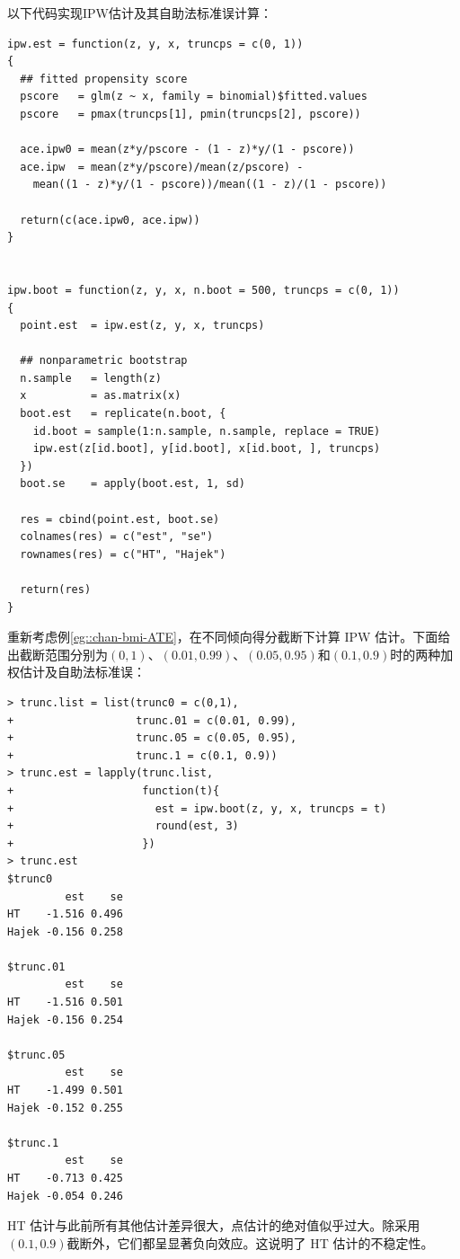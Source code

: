 以下代码实现IPW估计及其自助法标准误计算： 
\begin{lstlisting}
ipw.est = function(z, y, x, truncps = c(0, 1))
{
  ## fitted propensity score
  pscore   = glm(z ~ x, family = binomial)$fitted.values
  pscore   = pmax(truncps[1], pmin(truncps[2], pscore))
  
  ace.ipw0 = mean(z*y/pscore - (1 - z)*y/(1 - pscore))
  ace.ipw  = mean(z*y/pscore)/mean(z/pscore) - 
    mean((1 - z)*y/(1 - pscore))/mean((1 - z)/(1 - pscore))
  
  return(c(ace.ipw0, ace.ipw))     
}


ipw.boot = function(z, y, x, n.boot = 500, truncps = c(0, 1))
{
  point.est  = ipw.est(z, y, x, truncps)
  
  ## nonparametric bootstrap
  n.sample   = length(z)
  x          = as.matrix(x)
  boot.est   = replicate(n.boot, {
    id.boot = sample(1:n.sample, n.sample, replace = TRUE)
    ipw.est(z[id.boot], y[id.boot], x[id.boot, ], truncps)
  })
  boot.se    = apply(boot.est, 1, sd)
  
  res = cbind(point.est, boot.se)
  colnames(res) = c("est", "se")
  rownames(res) = c("HT", "Hajek")
  
  return(res)
}
\end{lstlisting}

重新考虑例\ref{eg::chan-bmi-ATE}，在不同倾向得分截断下计算 IPW 估计。下面给出截断范围分别为$(0,1)$、$(0.01, 0.99)$、$(0.05, 0.95)$和$(0.1, 0.9)$时的两种加权估计及自助法标准误：
\begin{lstlisting}
> trunc.list = list(trunc0 = c(0,1), 
+                   trunc.01 = c(0.01, 0.99), 
+                   trunc.05 = c(0.05, 0.95), 
+                   trunc.1 = c(0.1, 0.9))
> trunc.est = lapply(trunc.list,
+                    function(t){
+                      est = ipw.boot(z, y, x, truncps = t)
+                      round(est, 3)
+                    })
> trunc.est
$trunc0
         est    se
HT    -1.516 0.496
Hajek -0.156 0.258

$trunc.01
         est    se
HT    -1.516 0.501
Hajek -0.156 0.254

$trunc.05
         est    se
HT    -1.499 0.501
Hajek -0.152 0.255

$trunc.1
         est    se
HT    -0.713 0.425
Hajek -0.054 0.246
\end{lstlisting}
HT 估计与此前所有其他估计差异很大，点估计的绝对值似乎过大。除采用$(0.1, 0.9)$截断外，它们都呈显著负向效应。这说明了 HT 估计的不稳定性。 



